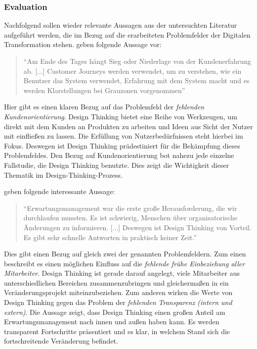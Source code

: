 \subsubsection{Evaluation}

Nachfolgend sollen wieder relevante Aussagen aus der untersuchten Literatur aufgeführt werden, die im Bezug auf die erarbeiteten Problemfelder der Digitalen Transformation stehen.  geben folgende Aussage vor: 

\begin{quote}
	``Am Ende des Tages hängt Sieg oder Niederlage von der Kundenerfahrung ab. [...] Customer Journeys werden verwendet, um zu verstehen, wie ein Benutzer das System verwendet, Erfahrung mit dem System macht und es werden Klarstellungen bei Grauzonen vorgenommen'' \cite[S. 3]{prasad_adopting_2018}
\end{quote}

Hier gibt es einen klaren Bezug auf das Problemfeld der \textit{fehlenden Kundenorientierung}. Design Thinking bietet eine Reihe von Werkzeugen, um direkt mit dem Kunden an Produkten zu arbeiten und Ideen aus Sicht der Nutzer mit einfließen zu lassen. Die Erfüllung von Nutzerbedürfnissen steht hierbei im Fokus. Deswegen ist Design Thinking prädestiniert für die Bekämpfung dieses Problemfeldes. Den Bezug auf Kundenorientierung bot nahezu jede einzelne Fallstudie, die Design Thinking benutzte. Dies zeigt die Wichtigkeit dieser Thematik im Design-Thinking-Prozess.

 geben folgende interessante Aussage:

\begin{quote}
	``Erwartungsmanagement war die erste große Herausforderung, die wir durchlaufen mussten. Es ist schwierig, Menschen über organisatorische Änderungen zu informieren. [...] Deswegen ist Design Thinking von Vorteil. Es gibt sehr schnelle Antworten in praktisch keiner Zeit.'' \cite{mihelic_embracing_nodate}
\end{quote}

Dies gibt einen Bezug auf gleich zwei der genannten Problemfeldern. Zum einen beschreibt es einen möglichen Einfluss auf die \textit{fehlende frühe Einbeziehung aller Mitarbeiter}. Design Thinking ist gerade darauf angelegt, viele Mitarbeiter aus unterschiedlichen Bereichen zusammenzubringen und gleichermaßen in ein Veränderungsprojekt miteinzubeziehen. Zum anderen wirken die Werte von Design Thinking gegen das Problem der \textit{fehlenden Transparenz (intern und extern)}. Die Aussage zeigt, dass Design Thinking einen großen Anteil am Erwartungsmanagement nach innen und außen haben kann. Es werden transparent Fortschritte präsentiert und es klar, in welchem Stand sich die fortschreitende Veränderung befindet.

